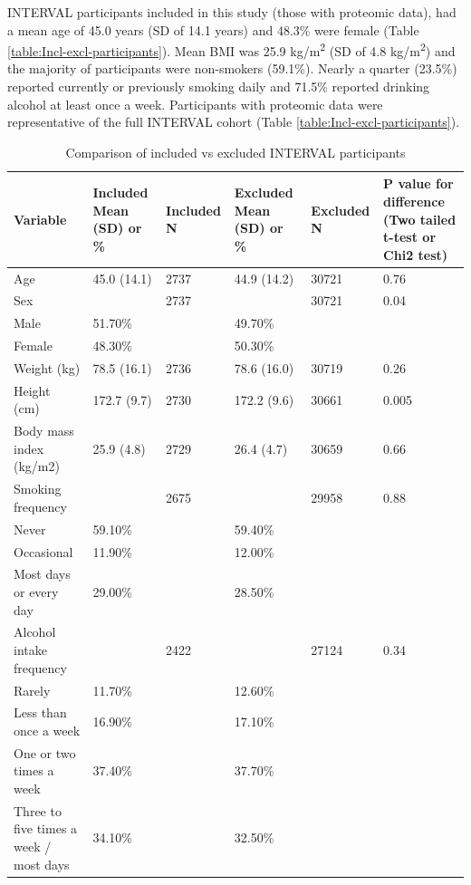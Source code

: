\documentclass[11pt,twoside]{bristolthesis}
\begin{document}
INTERVAL participants included in this study (those with proteomic data), had a mean age of 45.0 years (SD of 14.1 years) and 48.3\% were female (Table \ref{table:Incl-excl-participants}). Mean BMI was 25.9 kg/m\textsuperscript{2} (SD of 4.8 kg/m\textsuperscript{2}) and the majority of participants were non-smokers (59.1\%). Nearly a quarter (23.5\%) reported currently or previously smoking daily and 71.5\% reported drinking alcohol at least once a week. Participants with proteomic data were representative of the full INTERVAL cohort (Table \ref{table:Incl-excl-participants}).
\begin{landscape}\begin{table}

\caption{\label{tab:Inc-excl-participants}Comparison of included vs excluded INTERVAL participants}
\centering
\begin{tabu} to 
\toprule
Variable & Included Mean (SD) or \% & Included N & Excluded Mean (SD) or \% & Excluded N & P value for difference (Two tailed t-test or Chi2 test)\\
\midrule
Age & 45.0 (14.1) & 2737 & 44.9 (14.2) & 30721 & 0.76\\
Sex &  & 2737 &  & 30721 & 0.04\\
\hspace{1em}Male & 51.70\% &  & 49.70\% &  & \\
\hspace{1em}Female & 48.30\% &  & 50.30\% &  & \\
Weight (kg) & 78.5 (16.1) & 2736 & 78.6 (16.0) & 30719 & 0.26\\
\addlinespace
Height (cm) & 172.7 (9.7) & 2730 & 172.2 (9.6) & 30661 & 0.005\\
Body mass index (kg/m2) & 25.9 (4.8) & 2729 & 26.4 (4.7) & 30659 & 0.66\\
Smoking frequency &  & 2675 &  & 29958 & 0.88\\
\hspace{1em}Never & 59.10\% &  & 59.40\% &  & \\
\hspace{1em}Occasional & 11.90\% &  & 12.00\% &  & \\
\addlinespace
\hspace{1em}Most days or every day & 29.00\% &  & 28.50\% &  & \\
Alcohol intake frequency &  & 2422 &  & 27124 & 0.34\\
\hspace{1em}Rarely & 11.70\% &  & 12.60\% &  & \\
\hspace{1em}Less than once a week & 16.90\% &  & 17.10\% &  & \\
\hspace{1em}One or two times a week & 37.40\% &  & 37.70\% &  & \\
\addlinespace
\hspace{1em}Three to five times a week / most days & 34.10\% &  & 32.50\% &  & \\
\bottomrule
\end{tabu}
\end{table}
\end{landscape}
\end{document}

